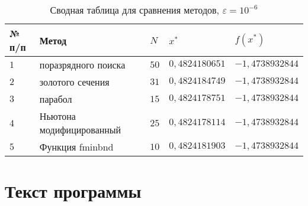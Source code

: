\documentclass{bmstu-gost-7-32}
\begin{document}
\begin{table}[H]
	\caption{Сводная таблица для сравнения методов, $\varepsilon = 10^{-6}$}
	\begin{tabular}{|l|l|l|l|l|}
		\hline
		№ п/п & Метод                    & $N$  & $x^*$          & $f(x^*)$        \\ \hline
		$1$   & поразрядного поиска      & $50$ & $0,4824180651$ & $-1,4738932844$ \\ \hline
		$2$   & золотого сечения         & $31$ & $0,4824184749$ & $-1,4738932844$ \\ \hline
		$3$   & парабол                  & $15$ & $0,4824178751$ & $-1,4738932844$ \\ \hline
		$4$   & Ньютона модифицированный & $25$ & $0,4824178114$ & $-1,4738932844$ \\ \hline
		$5$   & Функция fminbnd          & $10$ & $0,4824181903$ & $-1,4738932844$ \\ \hline
	\end{tabular}
\end{table}

\section*{Текст программы}


\end{document}
